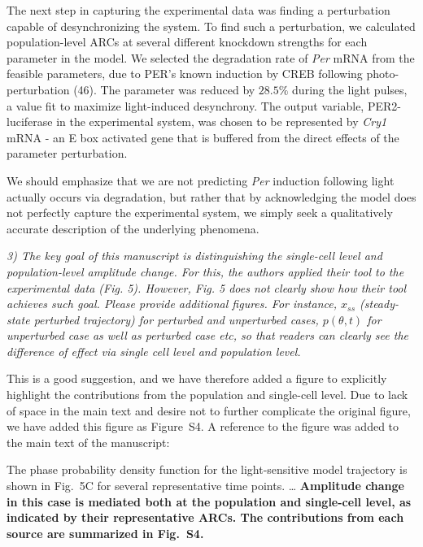 \documentclass[11pt, letterpaper]{article}
\newenvironment{reviewer}{\itshape\color{gray}}{}
\newenvironment{manuscript}[1]{\begin{center}\begin{tcolorbox}[colback=green!5!white,colframe=green!75!black,width=0.8\textwidth,title={#1},breakable,fonttitle=\bfseries]}{\end{tcolorbox}\end{center}}
\begin{document}
\begin{manuscript}{Page 16}
The next step in capturing the experimental data was finding a perturbation capable of desynchronizing the system.
To find such a perturbation, we calculated population-level ARCs at several different knockdown strengths for each parameter in the model.
We selected the degradation rate of {\itshape Per} mRNA from the feasible parameters, due to PER's known induction by CREB following photo-perturbation (46).
The parameter was reduced by $28.5\%$ during the light pulses, a value fit to maximize light-induced desynchrony.
The output variable, PER2-luciferase in the experimental system, was chosen to be represented by {\itshape Cry1} mRNA - an E box activated gene that is buffered from the direct effects of the parameter perturbation.
\end{manuscript}

We should emphasize that we are not predicting {\itshape Per} induction following light actually occurs via degradation, but rather that by acknowledging the model does not perfectly capture the experimental system, we simply seek a qualitatively accurate description of the underlying phenomena.

\begin{reviewer}
3) The key goal of this manuscript is distinguishing the single-cell level and population-level amplitude change. For this, the authors applied their tool to the experimental data (Fig. 5). However, Fig. 5 does not clearly show how their tool achieves such goal. Please provide additional figures. For instance, $x_{ss}$ (steady-state perturbed trajectory) for perturbed and unperturbed cases, $p(\theta, t)$ for unperturbed case as well as perturbed case etc, so that readers can clearly see the difference of effect via single cell level and population level.  
\end{reviewer}

This is a good suggestion, and we have therefore added a figure to explicitly highlight the contributions from the population and single-cell level.
Due to lack of space in the main text and desire not to further complicate the original figure, we have added this figure as Figure~S4. A reference to the figure was added to the main text of the manuscript:

\begin{manuscript}{Page 16}
The phase probability density function for the light-sensitive model trajectory is shown in Fig.~5C for several representative time points.
\ldots
{\bfseries Amplitude change in this case is mediated both at the population and single-cell level, as indicated by their representative ARCs. The contributions from each source are summarized in Fig.~S4.}
\end{manuscript}
\end{document}
